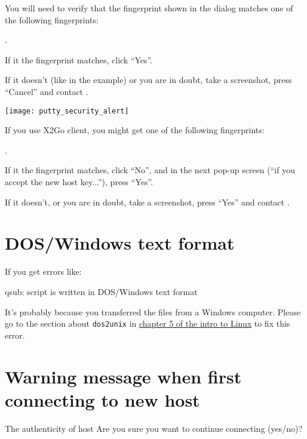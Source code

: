 \else

You will need to verify that the fingerprint shown in the dialog matches one of the
following fingerprints:

\puttyFirstConnect

.

If it the fingerprint matches, click ``Yes''.

If it doesn't (like in the example) or you are in doubt, take a screenshot, press ``Cancel'' and contact \hpcinfo.

\sshedfingerprintnote

\texttt{[image: putty\_security\_alert]}

\ifgent
If you use X2Go client, you might get one of the following fingerprints:

\xtwogoshaone

.

If it the fingerprint matches, click ``No'', and in the next pop-up screen (``if you accept the new host key...''), press ``Yes''.

If it doesn't, or you are in doubt, take a screenshot, press ``Yes'' and contact \hpcinfo.
\fi 

\fi


\section{DOS/Windows text format}

If you get errors like:

\begin{prompt}
qsub:  script is written in DOS/Windows text format
\end{prompt}

It's probably because you transferred the files from a Windows computer.
Please go to the section about \lstinline|dos2unix| in \href{\LinuxManualURL#sec:dos2unix}{chapter 5 of the intro to Linux}
to fix this error.

\section{Warning message when first connecting to new host}
\label{sec:warning-message-new-host}

\ifmacORlinux
\begin{prompt}
The authenticity of host %
Are you sure you want to continue connecting (yes/no)?
\end{prompt}

